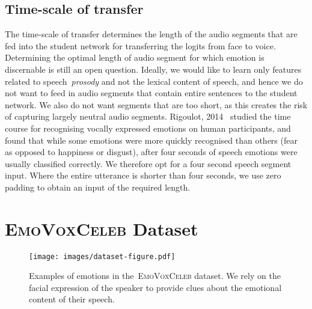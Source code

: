 \documentclass[sigconf]{acmart}
\newcommand{\datasetName}{\textsc{EmoVoxCeleb}}
\begin{document}
\subsection{Time-scale of transfer} 
The time-scale of transfer determines the length of the audio segments that are fed into the student network for transferring the logits from face to voice. Determining  the optimal length of audio segment for which emotion is discernable is still an open question. Ideally, we would like to learn only features related to speech~\textit{prosody} and not the lexical content of speech, and hence we do not want to feed in audio segments that contain entire sentences to the student network. We also do not want segments that are too short, as this creates the risk of capturing largely neutral audio segments. 
Rigoulot, 2014~\cite{rigoulot2014emotion} studied the time course for recognising vocally expressed emotions on human participants, and found that while some emotions were more quickly recognised than others (fear as opposed to happiness or disgust), after four seconds of speech emotions were usually classified correctly.
We therefore opt for a four second speech segment input. Where the entire utterance is shorter than four seconds, we use zero padding to obtain an input of the required length.

 \section{\datasetName{} Dataset}
\label{sec:dataset}

\begin{figure}[]
\centering
\texttt{[image: images/dataset-figure.pdf]}
   \caption{\small{Examples of emotions in the~\datasetName{} dataset.  We rely on the facial expression of the speaker to provide clues about the emotional content of their speech.}}
\label{fig:facetrack}
\end{figure}
\end{document}

